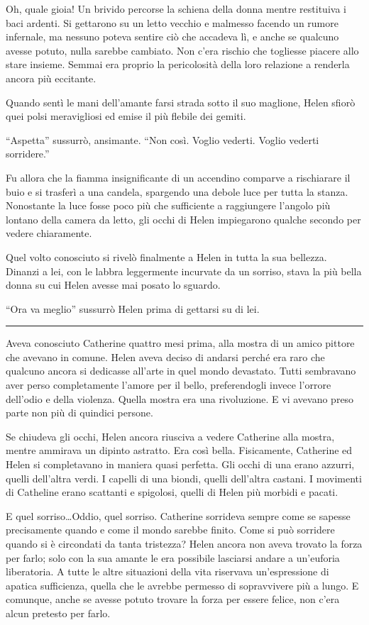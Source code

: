 \documentclass[a4paper,oneside,11pt]{memoir}
\begin{document}
Oh, quale gioia! Un brivido percorse la schiena della donna mentre restituiva i baci ardenti. Si
gettarono su un letto vecchio e malmesso facendo un rumore infernale, ma nessuno poteva sentire ciò
che accadeva lì, e anche se qualcuno avesse potuto, nulla sarebbe cambiato. Non c'era rischio che
togliesse piacere allo stare insieme. Semmai era proprio la pericolosità della loro relazione a
renderla ancora più eccitante.

Quando sentì le mani dell'amante farsi strada sotto il suo maglione, Helen sfiorò quei polsi
meravigliosi ed emise il più flebile dei gemiti.

``Aspetta'' sussurrò, ansimante. ``Non così. Voglio vederti. Voglio vederti sorridere.''

Fu allora che la fiamma insignificante di un accendino comparve a rischiarare il buio e si trasferì
a una candela, spargendo una debole luce per tutta la stanza. Nonostante la luce fosse poco più che
sufficiente a raggiungere l'angolo più lontano della camera da letto, gli occhi di Helen impiegarono
qualche secondo per vedere chiaramente.

Quel volto conosciuto si rivelò finalmente a Helen in tutta la sua bellezza. Dinanzi a lei, con le
labbra leggermente incurvate da un sorriso, stava la più bella donna su cui Helen avesse mai posato
lo sguardo.

``Ora va meglio'' sussurrò Helen prima di gettarsi su di lei.

\plainbreak{1}

Aveva conosciuto Catherine quattro mesi prima, alla mostra di un amico pittore che avevano in
comune. Helen aveva deciso di andarsi perché era raro che qualcuno ancora si dedicasse all'arte in
quel mondo devastato. Tutti sembravano aver perso completamente l'amore per il bello, preferendogli
invece l'orrore dell'odio e della violenza. Quella mostra era una rivoluzione. E vi avevano preso
parte non più di quindici persone.

Se chiudeva gli occhi, Helen ancora riusciva a vedere Catherine alla mostra, mentre ammirava un
dipinto astratto. Era così bella. Fisicamente, Catherine ed Helen si completavano in maniera quasi
perfetta. Gli occhi di una erano azzurri, quelli dell'altra verdi. I capelli di una biondi, quelli
dell'altra castani. I movimenti di Catheline erano scattanti e spigolosi, quelli di Helen più
morbidi e pacati.

E quel sorriso\dots Oddio, quel sorriso. Catherine sorrideva sempre come se sapesse precisamente
quando e come il mondo sarebbe finito. Come si può sorridere quando si è circondati da tanta
tristezza? Helen ancora non aveva trovato la forza per farlo; solo con la sua amante le era
possibile lasciarsi andare a un'euforia liberatoria. A tutte le altre situazioni della vita
riservava un'espressione di apatica sufficienza, quella che le avrebbe permesso di sopravvivere più
a lungo. E comunque, anche se avesse potuto trovare la forza per essere felice, non c'era alcun
pretesto per farlo.
\end{document}

